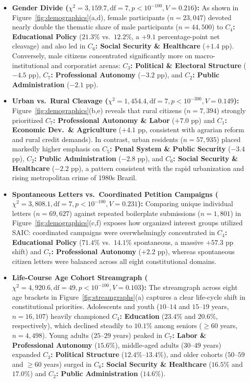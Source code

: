 \documentclass[pdflatex,sn-mathphys,iicol]{sn-jnl}
\begin{document}
\begin{itemize}
    \item \textbf{Gender Divide ($\chi^2 = 3,159.7, \text{df}=7, p < 10^{-100}, V = 0.216$):} As shown in Figure~\ref{fig:demographics}(a,d), female participants ($n=23,047$) devoted nearly double the thematic share of male participants ($n=44,500$) to \textbf{$C_4$: Educational Policy} ($21.3\%$ vs.\ $12.2\%$, a $+9.1$ percentage-point net cleavage) and also led in \textbf{$C_6$: Social Security \& Healthcare} ($+1.4$ pp). Conversely, male citizens concentrated significantly more on macro-institutional and corporatist arenas: \textbf{$C_3$: Political \& Electoral Structure} ($-4.5$ pp), \textbf{$C_7$: Professional Autonomy} ($-3.2$ pp), and \textbf{$C_2$: Public Administration} ($-2.1$ pp).
    \item \textbf{Urban vs.\ Rural Cleavage ($\chi^2 = 1,454.4, \text{df}=7, p < 10^{-300}, V = 0.149$):} Figure~\ref{fig:demographics}(b,e) reveals that rural citizens ($n=7,394$) strongly prioritized \textbf{$C_7$: Professional Autonomy \& Labor} ($+7.0$ pp) and \textbf{$C_1$: Economic Dev.\ \& Agriculture} ($+4.1$ pp, consistent with agrarian reform and rural credit demands). In contrast, urban residents ($n=57,935$) placed markedly higher emphasis on \textbf{$C_5$: Penal System \& Public Security} ($-3.4$ pp), \textbf{$C_2$: Public Administration} ($-2.8$ pp), and \textbf{$C_6$: Social Security \& Healthcare} ($-2.2$ pp), a pattern consistent with the rapid urbanization and rising metropolitan crime of 1980s Brazil.
    \item \textbf{Spontaneous Letters vs.\ Coordinated Petition Campaigns ($\chi^2 = 3,808.1, \text{df}=7, p < 10^{-100}, V = 0.231$):} Comparing unique individual letters ($n=69,627$) against repeated boilerplate submissions ($n=1,801$) in Figure~\ref{fig:demographics}(c,f) exposes how organized interest groups utilized SAIC: coordinated campaigns were overwhelmingly concentrated in \textbf{$C_4$: Educational Policy} ($71.4\%$ vs.\ $14.1\%$ spontaneous, a massive $+57.3$ pp shift) and \textbf{$C_7$: Professional Autonomy} ($+2.2$ pp), whereas spontaneous citizen letters were balanced across all eight constitutional domains.
    \item \textbf{Life-Course Age Cohort Streamgraph ($\chi^2 = 4,920.6, \text{df}=49, p < 10^{-100}, V = 0.103$):} The streamgraph across eight age brackets in Figure~\ref{fig:streamgraphs}(a) captures a clear life-cycle shift in constitutional priorities. Adolescents and youth ($10$--$14$ and $15$--$19$ years, $n=16,107$) heavily championed \textbf{$C_4$: Education} ($23.4\%$ and $20.6\%$, respectively), which declined steadily to $10.1\%$ among seniors ($\ge 60$ years, $n=4,498$). Young adults ($25$--$29$ years) peaked in \textbf{$C_7$: Labor \& Professional Autonomy} ($15.6\%$), middle-aged adults ($30$--$49$ years) expanded \textbf{$C_3$: Political Structure} ($12.4\%$--$13.4\%$), and older cohorts ($50$--$59$ and $\ge 60$ years) surged in \textbf{$C_6$: Social Security \& Healthcare} ($16.5\%$ and $17.0\%$) and \textbf{$C_2$: Public Administration} ($14.6\%$).

\end{itemize}
\end{document}
